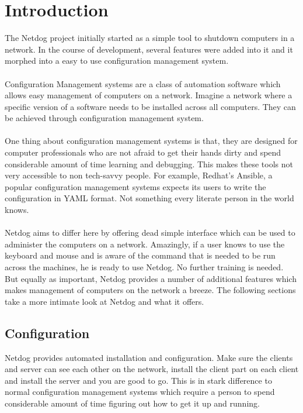 \chapter{Introduction}

The Netdog project initially started as a simple tool to shutdown computers in a
network. In the course of development, several features were added into it and
it morphed into a easy to use configuration management system.
\\\\
Configuration Management systems are a class of automation software which allows
easy management of computers on a network. Imagine a network where a specific
version of a software needs to be installed across all computers. They can be
achieved through configuration management system.
\\\\
One thing about configuration management systems is that, they are designed for
computer professionals who are not afraid to get their hands dirty and spend
considerable amount of time learning and debugging. This makes these tools not
very accessible to non tech-savvy people. For example, Redhat's Ansible, a
popular configuration management systems expects its users to write the
configuration in YAML format. Not something every literate person in the world
knows.
\\\\
Netdog aims to differ here by offering dead simple interface which can be used
to administer the computers on a network. Amazingly, if a user knows to use the
keyboard and mouse and is aware of the command that is needed to be run across
the machines, he is ready to use Netdog. No further training is needed. But
equally as important, Netdog provides a number of additional features which
makes management of computers on the network a breeze. The following sections
take a more intimate look at Netdog and what it offers.

\section{Configuration}

Netdog provides automated installation and configuration. Make sure the clients
and server can see each other on the network, install the client part on each
client and install the server and you are good to go. This is in stark
difference to normal configuration management systems which require a person to
spend considerable amount of time figuring out how to get it up and running.

